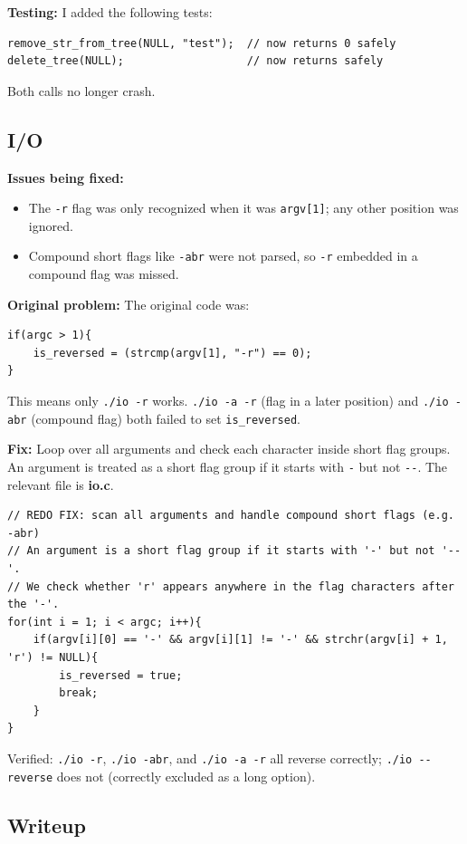 \documentclass{exam}
\begin{document}
\textbf{Testing:} I added the following tests:
\begin{verbatim}
remove_str_from_tree(NULL, "test");  // now returns 0 safely
delete_tree(NULL);                   // now returns safely
\end{verbatim}
Both calls no longer crash.

\subsection*{I/O}

\textbf{Issues being fixed:}
\begin{itemize}
    \item The \verb|-r| flag was only recognized when it was \verb|argv[1]|; any other position was ignored.
    \item Compound short flags like \verb|-abr| were not parsed, so \verb|-r| embedded in a compound flag was missed.
\end{itemize}

\textbf{Original problem:} The original code was:
\begin{verbatim}
if(argc > 1){
    is_reversed = (strcmp(argv[1], "-r") == 0);
}
\end{verbatim}
This means only \verb|./io -r| works.
\verb|./io -a -r| (flag in a later position) and \verb|./io -abr| (compound flag) both failed to set \verb|is_reversed|.

\textbf{Fix:} Loop over all arguments and check each character inside short flag groups.
An argument is treated as a short flag group if it starts with \verb|-| but not \verb|--|.
The relevant file is \textbf{io.c}.

\begin{verbatim}
// REDO FIX: scan all arguments and handle compound short flags (e.g. -abr)
// An argument is a short flag group if it starts with '-' but not '--'.
// We check whether 'r' appears anywhere in the flag characters after the '-'.
for(int i = 1; i < argc; i++){
    if(argv[i][0] == '-' && argv[i][1] != '-' && strchr(argv[i] + 1, 'r') != NULL){
        is_reversed = true;
        break;
    }
}
\end{verbatim}
Verified: \verb|./io -r|, \verb|./io -abr|, and \verb|./io -a -r| all reverse correctly; \verb|./io --reverse| does not (correctly excluded as a long option).

\subsection*{Writeup}
\end{document}
